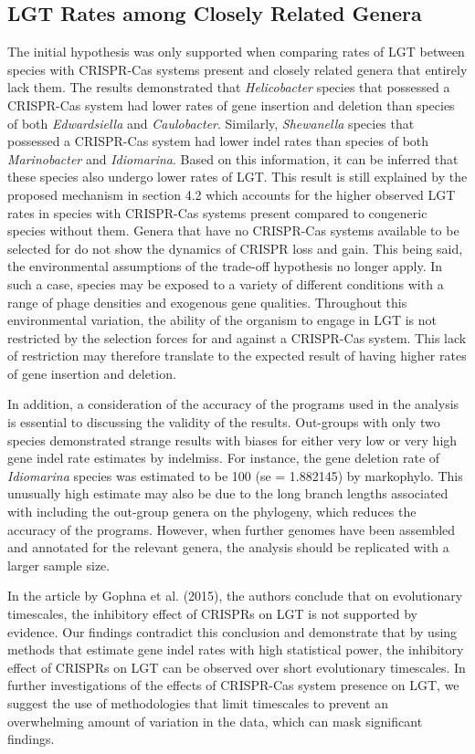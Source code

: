 \documentclass[english]{article}
\begin{document}
\subsection{LGT Rates among Closely Related Genera}

The initial hypothesis was only supported when comparing rates of LGT
between species with CRISPR-Cas systems present and closely related
genera that entirely lack them. The results demonstrated that
\textit{Helicobacter} species that possessed a CRISPR-Cas system had lower
rates of gene insertion and deletion than species of both
\textit{Edwardsiella} and
\textit{Caulobacter}. Similarly, \textit{Shewanella} 
species that possessed a CRISPR-Cas
system had lower indel rates than species of both
\textit{Marinobacter} and
\textit{Idiomarina}. Based on this information, 
it can be inferred that these
species also undergo lower rates of LGT. This result is still
explained by the proposed mechanism in section 4.2 which accounts for the
higher observed LGT rates in species with CRISPR-Cas systems present
compared to congeneric species without them. Genera that have no 
CRISPR-Cas systems available to be selected for do not show the 
dynamics of CRISPR loss and gain. This being said, the 
environmental assumptions of the trade-off
hypothesis no longer apply. In such a case, species may be exposed to
a variety of different conditions with a range of phage densities and
exogenous gene qualities. Throughout this environmental variation, 
the ability of the
organism to engage in LGT is not restricted by the selection forces
for and against a CRISPR-Cas system. This lack of restriction may
therefore translate to the expected result of having higher rates of
gene insertion and deletion. 

In addition, a consideration of the accuracy of the programs
used in the analysis is essential to discussing the validity of the
results. Out-groups with only two species demonstrated strange results
with biases for either very low or very high gene indel rate estimates
by indelmiss. For instance, the gene deletion rate of
\textit{Idiomarina}
species was estimated to be 100 (se = 1.882145) by markophylo. 
This unusually high estimate may also be due to the long branch
lengths associated with including the out-group genera on the
phylogeny, which reduces the accuracy of the programs. 
However, when further genomes have been assembled and annotated for
the relevant genera, the analysis should be replicated with a larger
sample size. 

In the article by Gophna  et al. (2015), the authors conclude
that on evolutionary  timescales, the inhibitory  effect of CRISPRs
on LGT is not supported  by evidence.  Our findings contradict this
conclusion and demonstrate that by using methods that estimate gene
indel rates with high statistical power, the inhibitory effect of
CRISPRs on LGT can be observed over short evolutionary timescales. In
further investigations of the effects of CRISPR-Cas system presence on
LGT, we suggest the use of methodologies that limit timescales to
prevent an overwhelming amount of variation in the data, which can
mask significant findings. 
\end{document}
